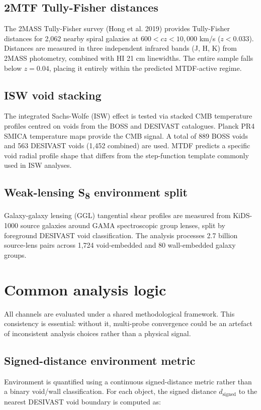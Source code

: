 \documentclass[11pt,a4paper]{article}
\begin{document}
\subsection{2MTF Tully-Fisher distances}
The 2MASS Tully-Fisher survey (Hong et al. 2019) provides Tully-Fisher distances for 2,062 nearby spiral galaxies at \(600 < cz < 10{,}000\) km/\allowbreak{}s (\(z < 0.033\)). Distances are measured in three independent infrared bands (J, H, K) from 2MASS photometry, combined with HI 21 cm linewidths. The entire sample falls below \(z = 0.04\), placing it entirely within the predicted MTDF-active regime.

\subsection{ISW void stacking}
The integrated Sachs-Wolfe (ISW) effect is tested via stacked CMB temperature profiles centred on voids from the BOSS and DESIVAST catalogues. Planck PR4 SMICA temperature maps provide the CMB signal. A total of 889 BOSS voids and 563 DESIVAST voids (1,452 combined) are used. MTDF predicts a specific void radial profile shape that differs from the step-function template commonly used in ISW analyses.

\subsection{Weak-lensing S\textsubscript{8} environment split}
Galaxy-galaxy lensing (GGL) tangential shear profiles are measured from KiDS-1000 source galaxies around GAMA spectroscopic group lenses, split by foreground DESIVAST void classification. The analysis processes 2.7 billion source-lens pairs across 1,724 void-embedded and 80 wall-embedded galaxy groups.

\section{Common analysis logic}
\label{sec:sec4}
All channels are evaluated under a shared methodological framework. This consistency is essential: without it, multi-probe convergence could be an artefact of inconsistent analysis choices rather than a physical signal.

\subsection{Signed-distance environment metric}
Environment is quantified using a continuous signed-distance metric rather than a binary void/\allowbreak{}wall classification. For each object, the signed distance \(d_\mathrm{signed}\) to the nearest DESIVAST void boundary is computed as:
\end{document}
